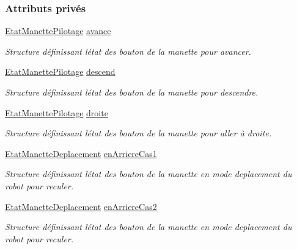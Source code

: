 \subsubsection*{Attributs privés}
\begin{DoxyCompactItemize}
\item 
\hyperlink{struct_etat_manette_pilotage}{Etat\+Manette\+Pilotage} \hyperlink{class_manette_a6ff181eab8c2206ca3d40bf5112e72ec}{avance}
\begin{DoxyCompactList}\small\item\em Structure définissant l\textquotesingle{}état des bouton de la manette pour avancer. \end{DoxyCompactList}\item 
\hyperlink{struct_etat_manette_pilotage}{Etat\+Manette\+Pilotage} \hyperlink{class_manette_a95e7f41f1e15f01d7530062801817304}{descend}
\begin{DoxyCompactList}\small\item\em Structure définissant l\textquotesingle{}état des bouton de la manette pour descendre. \end{DoxyCompactList}\item 
\hyperlink{struct_etat_manette_pilotage}{Etat\+Manette\+Pilotage} \hyperlink{class_manette_a40a2dc8420742b04c3eee14e477992b1}{droite}
\begin{DoxyCompactList}\small\item\em Structure définissant l\textquotesingle{}état des bouton de la manette pour aller à droite. \end{DoxyCompactList}\item 
\hyperlink{struct_etat_manette_deplacement}{Etat\+Manette\+Deplacement} \hyperlink{class_manette_a915c1867ed0f8f9be3a1bf5d87c23813}{en\+Arriere\+Cas1}
\begin{DoxyCompactList}\small\item\em Structure définissant l\textquotesingle{}état des bouton de la manette en mode deplacement du robot pour reculer. \end{DoxyCompactList}\item 
\hyperlink{struct_etat_manette_deplacement}{Etat\+Manette\+Deplacement} \hyperlink{class_manette_aa620cef4ea733aa3b9dee18377aee140}{en\+Arriere\+Cas2}
\begin{DoxyCompactList}\small\item\em Structure définissant l\textquotesingle{}état des bouton de la manette en mode deplacement du robot pour reculer. \end{DoxyCompactList}\item 

\end{DoxyCompactItemize}
